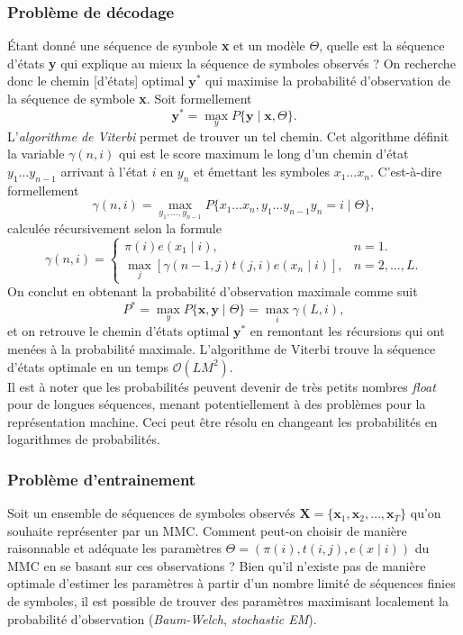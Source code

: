 \documentclass[a4paper, 11pt]{article}
\newcommand{\pinit}{\pi (i)}
\newcommand{\ptrans}{t(i,j)}
\newcommand{\pemi}{e(x\mid i)}
\begin{document}
\subsubsection{Problème de décodage}
Étant donné une séquence de symbole \textbf{x} et un modèle $\Theta$, quelle est la séquence d'états \textbf{y} qui explique au mieux la séquence de symboles observés ? On recherche donc le chemin [d'états] optimal $\textbf{y}^*$ qui maximise la probabilité d'observation de la séquence de symbole \textbf{x}. Soit formellement
\begin{equation}
\textbf{y}^*=\max_y P\{\textbf{y}\mid \textbf{x},\Theta\}.
\end{equation}
L'\textit{algorithme de Viterbi} permet de trouver un tel chemin. Cet algorithme définit la variable $\gamma (n,i)$ qui est le score maximum le long d'un chemin d'état $y_1\dotsc y_{n-1}$ arrivant à l'état $i$ en $y_n$ et émettant les symboles $x_1\dotsc x_n$. C'est-à-dire formellement
\begin{equation}
\gamma (n,i) = \max_{y_1,\dotsc ,y_{n-1}}P\{x_1\dotsc x_n,y_1\dotsc y_{n-1}y_n=i\mid\Theta\},
\end{equation}
calculée récursivement selon la formule
\begin{equation}
\gamma (n,i) = \begin{cases}
	\pi (i)e(x_1\mid i), & n=1.\\
	\max\limits_{j}[\gamma (n-1,j)t(j,i)e(x_{n}\mid i)], & n=2,\dotsc ,L.
\end{cases}
\end{equation}
On conclut en obtenant la probabilité d'observation maximale comme suit
\begin{equation}
P^*= \max_y P\{\textbf{x},\textbf{y}\mid\Theta\}= \max_i \gamma (L,i),
\end{equation}
et on retrouve le chemin d'états optimal $\textbf{y}^*$ en remontant les récursions qui ont menées à la probabilité maximale. L'algorithme de Viterbi trouve la séquence d'états optimale en un temps $\mathcal{O}(LM^2)$.
\\
Il est à noter que les probabilités peuvent devenir de très petits nombres \textit{float} pour de longues séquences, menant potentiellement à des problèmes pour la représentation machine. Ceci peut être résolu en changeant les probabilités en logarithmes de probabilités.
\subsubsection{Problème d'entrainement}
Soit un ensemble de séquences de symboles observés $\textbf{X}=\{\textbf{x}_1,\textbf{x}_2,\dotsc ,\textbf{x}_T\}$ qu'on souhaite représenter par un MMC. Comment peut-on choisir de manière raisonnable et adéquate les paramètres $\Theta = (\pinit,\ptrans,\pemi)$ du MMC en se basant sur ces observations ? Bien qu'il n'existe pas de manière optimale d'estimer les paramètres à partir d'un nombre limité de séquences finies de symboles, il est possible de trouver des paramètres maximisant localement la probabilité d'observation (\textit{Baum-Welch}, \textit{stochastic EM}).
\end{document}
